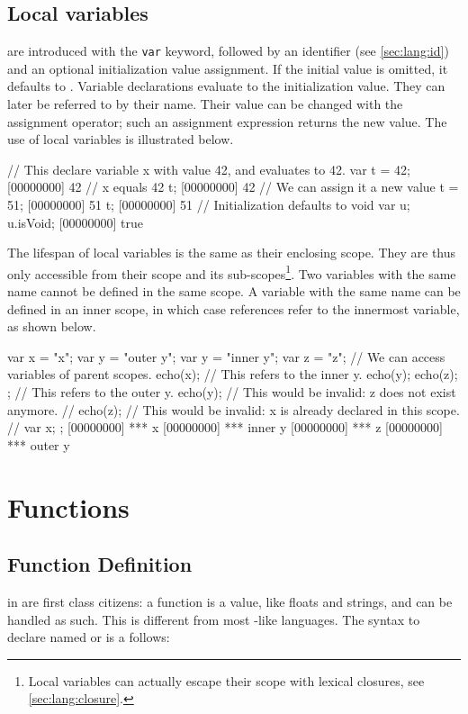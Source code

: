 \subsection{Local variables}
\label{sec:lang:var}
 are introduced with the \lstinline{var} keyword,
followed by an identifier (see \autoref{sec:lang:id}) and an optional
initialization value assignment. If the initial value is omitted, it
defaults to . Variable declarations evaluate to the
initialization value. They can later be referred to by their name. Their
value can be changed with the assignment operator; such an assignment
expression returns the new value. The use of local variables is illustrated
below.

\begin{urbiscript}
// This declare variable x with value 42, and evaluates to 42.
var t = 42;
[00000000] 42
// x equals 42
t;
[00000000] 42
// We can assign it a new value
t = 51;
[00000000] 51
t;
[00000000] 51
// Initialization defaults to void
var u;
u.isVoid;
[00000000] true
\end{urbiscript}

The lifespan of local variables is the same as their enclosing scope. They
are thus only accessible from their scope and its
sub-scopes\footnote{Local variables can actually escape their scope
  with lexical closures, see \autoref{sec:lang:closure}.}. Two
variables with the same name cannot be defined in the same scope. A
variable with the same name can be defined in an inner scope, in which
case references refer to the innermost variable, as shown below.

\begin{urbiscript}
{
  var x = "x";
  var y = "outer y";
  {
    var y = "inner y";
    var z = "z";
    // We can access variables of parent scopes.
    echo(x);
    // This refers to the inner y.
    echo(y);
    echo(z);
  };
  // This refers to the outer y.
  echo(y);
  // This would be invalid: z does not exist anymore.
  // echo(z);
  // This would be invalid: x is already declared in this scope.
  // var x;
};
[00000000] *** x
[00000000] *** inner y
[00000000] *** z
[00000000] *** outer y
\end{urbiscript}


\section{Functions}

\subsection{Function Definition}
\label{sec:lang:function}
 in \us are first class citizens: a function is a value, like
floats and strings, and can be handled as such.  This is different from most
\langC-like languages.  The syntax to declare named or  is a follows:



